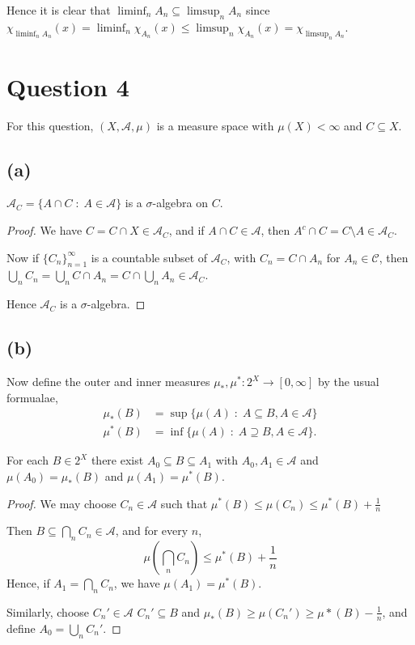 \documentclass{unswmaths}
\begin{document}
    Hence it is clear that $\liminf_n A_n \subseteq \limsup_n A_n$
    since $\chi_{\liminf_n A_n}(x) = \liminf_{n} \chi_{A_n}(x) \leq \limsup_{n} \chi_{A_n}(x) = \chi_{\limsup_n A_n}$.
    
    
\section*{Question 4}
For this question, $(X,\mathcal{A},\mu)$ is a measure space with $\mu(X) <\infty$
and $C \subseteq X$.

\subsection*{(a)}
\begin{lemma}
    $\mathcal{A}_C = \{A\cap C\;:\;A \in \mathcal{A}\}$
    is a $\sigma$-algebra on $C$.
\end{lemma}
\begin{proof}
    We have $C = C\cap X \in\mathcal{A}_C$,
    and if $A\cap C \in \mathcal{A}$, then $A^c\cap C = C\setminus A \in \mathcal{A}_C$. 
    
    Now if $\{C_n\}_{n=1}^\infty$ is a countable subset of $\mathcal{A}_C$,
    with $C_n = C\cap A_n$ for $A_n \in \mathcal{C}$,
    then $\bigcup_n C_n = \bigcup_n C\cap A_n = C\cap \bigcup_n A_n \in \mathcal{A}_C$.
    
    Hence $\mathcal{A}_C$ is a $\sigma$-algebra.
\end{proof}

\subsection*{(b)}
Now define the outer and inner measures $\mu_*,\mu^*:2^X\rightarrow[0,\infty]$
by the usual formualae,
\begin{align*}
    \mu_*(B) &= \sup\{\mu(A)\;:\;A\subseteq B,A\in\mathcal{A}\}\\
    \mu^*(B) &= \inf\{\mu(A)\;:\;A\supseteq B,A\in\mathcal{A}\}.
\end{align*}
\begin{lemma}
    For each $B \in 2^X$ there exist $A_0 \subseteq B \subseteq A_1$
    with $A_0,A_1 \in \mathcal{A}$ and $\mu(A_0) = \mu_*(B)$
    and $\mu(A_1) = \mu^*(B)$.
\end{lemma}
\begin{proof}
    We may choose $C_n \in \mathcal{A}$ such that $\mu^*(B) \leq \mu(C_n) \leq \mu^*(B)+\frac{1}{n}$
    
    Then $B \subseteq \bigcap_n C_n \in \mathcal{A}$,
    and for every $n$,
    \begin{equation*}
        \mu(\bigcap_{n} C_n) \leq \mu^*(B) + \frac{1}{n}
    \end{equation*} 
    Hence, if $A_1 = \bigcap_n C_n$, we have $\mu(A_1) = \mu^*(B)$.
    
    
    Similarly, choose $C_n' \in \mathcal{A}$ $C_n' \subseteq B$
    and $\mu_*(B) \geq \mu(C_n') \geq \mu*(B) -\frac{1}{n}$,
    and define $A_0 = \bigcup_n C_n'$.
\end{proof}
\end{document}
